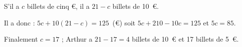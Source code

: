 
\medskip 

% 
%
% 
S'il a $c$ billets de cinq \euro, il a $21 - c$ billets de 10~\euro.

Il a donc :
$5c + 10(21 - c) = 125$~(\euro) soit $5c + 210 - 10c = 125$ et $5c = 85$.

Finalement $c = 17$ ; Arthur a $21 - 17 = 4$ billets de 10~\euro{} et 17 billets de 5~\euro.

%

\bigskip


